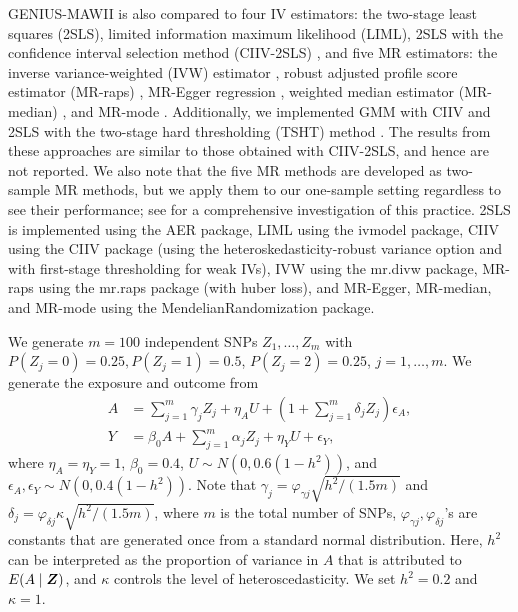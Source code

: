 \documentclass[12pt]{article}
\begin{document}
{GENIUS-MAWII is also compared to four IV estimators: the two-stage least squares (2SLS), limited information maximum likelihood (LIML), {2SLS with the confidence interval selection method (CIIV-2SLS) \citep{windmeijer2021confidence}}, and five MR estimators: the inverse variance-weighted (IVW) estimator \citep{Burgess:2013aa}, robust adjusted profile score estimator (MR-raps) \citep{zhao2018statistical}, MR-Egger regression \citep{Bowden:2015aa}, {weighted median estimator (MR-median)} \citep{Bowden:2016aa}, and MR-mode \citep{Hartwig:2017aa}. {Additionally, we implemented GMM with CIIV and  2SLS with the two-stage hard thresholding (TSHT) method \citep{Guo:2018aa}. The results from these approaches are similar to those obtained with CIIV-2SLS, and hence are not reported.} We also note that the five MR methods are developed as two-sample MR methods, but we apply them to our one-sample setting regardless to see their performance; {see \cite{minelli2021use} for a comprehensive investigation of this practice.}  2SLS is implemented using the \textsf{AER} package, LIML using the \textsf{ivmodel} package, CIIV using the   \textsf{CIIV} package (using the heteroskedasticity-robust variance option and with first-stage thresholding for weak IVs), IVW  using the \textsf{mr.divw} package, MR-raps using the \textsf{mr.raps} package (with huber loss), and MR-Egger, MR-median, and MR-mode using the \textsf{MendelianRandomization} package. 

{We generate $m=100$ independent SNPs $Z_1, \dots, Z_m$ with $P(Z_j=0)=0.25, P(Z_j=1)=0.5$, $P(Z_j=2)=0.25$, $j=1,\dots, m$. We generate the exposure and outcome from 
\begin{align*}
A&= \sum_{j=1}^m  \gamma_j  Z_j +\eta_A  U+ \left( 1 + \sum_{j=1}^m  \delta_j  Z_j \right) \epsilon_A, \\ 
Y&= \beta_0 A+ \sum_{j=1}^m  \alpha_j Z_j + \eta_Y U+ \epsilon_Y,
\end{align*}
where $\eta_A=\eta_Y=1$, $\beta_0=0.4$, $U\sim N(0, 0.6(1- h^2))$, and  $\epsilon_A, \epsilon_Y \sim N(0, 0.4(1- h^2))$. 	Note that $\gamma_j = \varphi_{\gamma j} \sqrt{ h^2 /(1.5m)}$ and $\delta_j  =  \varphi_{\delta j} \kappa \sqrt{ h^2 /(1.5m)} $, where $m$ is the total number of SNPs, $\varphi_{\gamma j}, \varphi_{\delta j}  $'s are constants that are generated once from a standard normal distribution. Here,  $h^2$ can be interpreted as the proportion of variance in $A$ that is attributed to $E(A\mid \bm{Z})$, and $\kappa$ controls the level of heteroscedasticity. We set $h^2=0.2$ and $\kappa=1$.


}}
\end{document}
